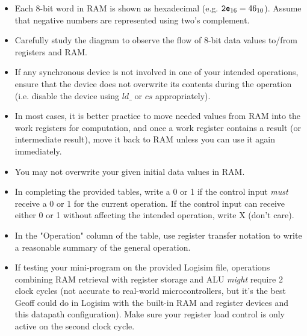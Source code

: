 \begin{itemize}
    \item Each 8-bit word in RAM is shown as hexadecimal (e.g. ${\tt2e}_{16} = 46_{10}$). Assume that negative numbers are represented using two's complement.
    \item Carefully study the diagram to observe the flow of 8-bit data values to/from registers and RAM.
    \item If any synchronous device is not involved in one of your intended operations, ensure that the device does not overwrite its contents during the operation (i.e. disable the device using $ld\_$ or $cs$ appropriately).
    \item In most cases, it is better practice to move needed values from RAM into the work registers for computation, and once a work register contains a result (or intermediate result), move it back to RAM unless you can use it again immediately.
    \item You may not overwrite your given initial data values in RAM.
    \item In completing the provided tables, write a 0 or 1 if the control input \textit{must} receive a 0 or 1 for the current operation. If the control input can receive either 0 or 1 without affecting the intended operation, write X (don't care).
    \item In the "Operation" column of the table, use register transfer notation to write a reasonable summary of the general operation.
    \item If testing your mini-program on the provided Logisim file, operations combining RAM retrieval with register storage and ALU \textit{might} require 2 clock cycles (not accurate to real-world microcontrollers, but it's the best Geoff could do in Logisim with the built-in RAM and register devices and this datapath configuration). Make sure your register load control is only active on the second clock cycle.
\end{itemize}

\newpage

